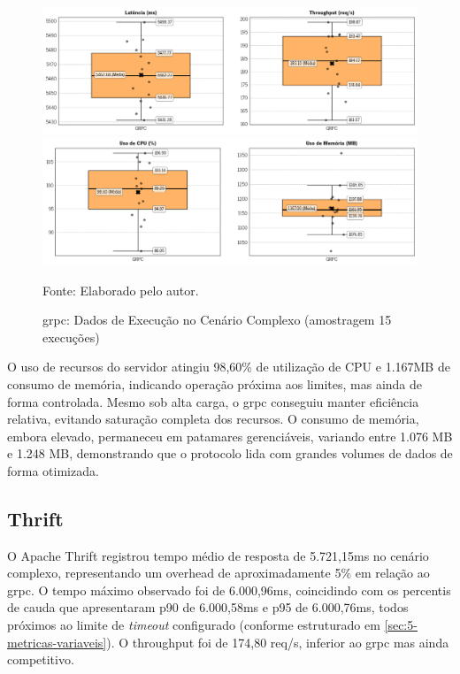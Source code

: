 \begin{figure}[H]
    \caption{\acrshort{grpc}: Dados de Execução no Cenário Complexo (amostragem 15 execuções)}
    \label{fig:5-Complexo-gRPC-k6}
    \centering
    \includegraphics[width=1\linewidth]{imagens//resultados/5-resultados-Complexo-gRPC-k6.png}
    \includegraphics[width=1\linewidth]{imagens//resultados/5-resultados-Complexo-gRPC-prometheus.png}    
    {\par \raggedright \footnotesize Fonte: Elaborado pelo autor.\par}
\end{figure}

O uso de recursos do servidor atingiu 98,60\% de utilização de CPU e 1.167MB de consumo de memória, indicando operação próxima aos limites, mas ainda de forma controlada. Mesmo sob alta carga, o \gls{grpc} conseguiu manter eficiência relativa, evitando saturação completa dos recursos. O consumo de memória, embora elevado, permaneceu em patamares gerenciáveis, variando entre 1.076 MB e 1.248 MB, demonstrando que o protocolo lida com grandes volumes de dados de forma otimizada.

\subsection{Thrift}

O Apache Thrift registrou tempo médio de resposta de 5.721,15ms no cenário complexo, representando um overhead de aproximadamente 5\% em relação ao \gls{grpc}. O tempo máximo observado foi de 6.000,96ms, coincidindo com os percentis de cauda que apresentaram p90 de 6.000,58ms e p95 de 6.000,76ms, todos próximos ao limite de \textit{timeout} configurado (conforme estruturado em \autoref{sec:5-metricas-variaveis}). O throughput foi de 174,80 req/s, inferior ao \gls{grpc} mas ainda competitivo.

